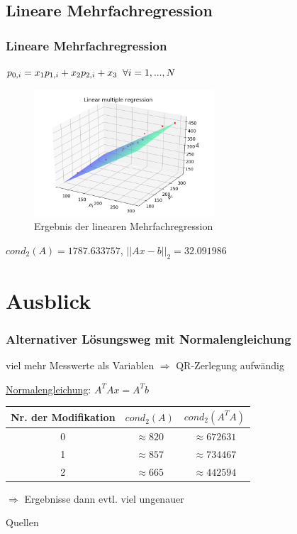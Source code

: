 \documentclass{beamer}
\begin{document}
\subsection{Lineare Mehrfachregression}
\begin{frame} %
  \frametitle{Lineare Mehrfachregression} %
\centering
$p_{0,i} = x_1 p_{1,i} + x_2 p_{2, i} + x_3 \thickspace \thickspace \forall i = 1,...,N$

  \begin{figure}

    \centering
      \includegraphics[width=0.6\textwidth]{Linear_Multi_Regression}
      \vspace{-1em}
    \caption{Ergebnis der linearen Mehrfachregression}
  \end{figure}
  \vspace{-1em}
  \centering

  $cond_2(A) = 1787.633757$, $||Ax-b||_2 = 32.091986$

\end{frame}

\section{Ausblick}

\begin{frame} %
  \frametitle{Alternativer Lösungsweg mit Normalengleichung} %
\centering

viel mehr Messwerte als Variablen $\Rightarrow$ QR-Zerlegung aufwändig
\bigskip

\underline{Normalengleichung}: $A^T Ax = A^T b$
\bigskip

\pause
\begin{tabular}{c|c|c}
  Nr. der Modifikation & $cond_2(A)$    & $cond_2(A^T A)$\\ \hline
                     0 & $\approx 820$  & $\approx 672631$\\ \hline
                     1 & $\approx 857$  & $\approx 734467$\\ \hline
                     2 & $\approx 665$  & $\approx 442594$
\end{tabular}

\pause
\bigskip

$\Rightarrow$ Ergebnisse dann evtl. viel ungenauer

\end{frame}

\begin{frame}{Quellen}
  
  
  \nocite{*}
\end{frame}
\end{document}
